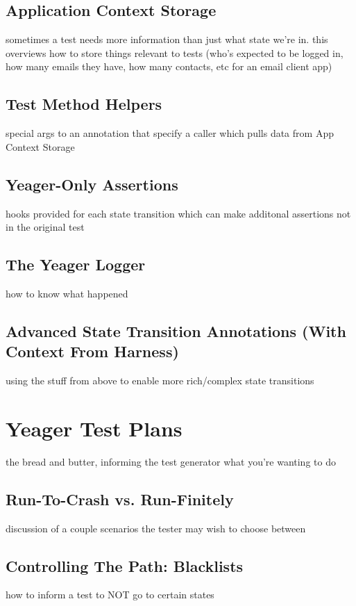 \subsection{Application Context Storage}
sometimes a test needs more information than just what state we're in. this overviews how to store things relevant to tests (who's expected to be logged in, how many emails they have, how many contacts, etc for an email client app)

\subsection{Test Method Helpers}
special args to an annotation that specify a caller which pulls data from App Context Storage

\subsection{Yeager-Only Assertions}
hooks provided for each state transition which can make additonal assertions not in the original test

\subsection{The Yeager Logger}
how to know what happened

\subsection{Advanced State Transition Annotations (With Context From Harness)}
using the stuff from above to enable more rich/complex state transitions

\section{Yeager Test Plans}
the bread and butter, informing the test generator what you're wanting to do

\subsection{Run-To-Crash vs. Run-Finitely}
discussion of a couple scenarios the tester may wish to choose between

\subsection{Controlling The Path: Blacklists}
how to inform a test to NOT go to certain states

